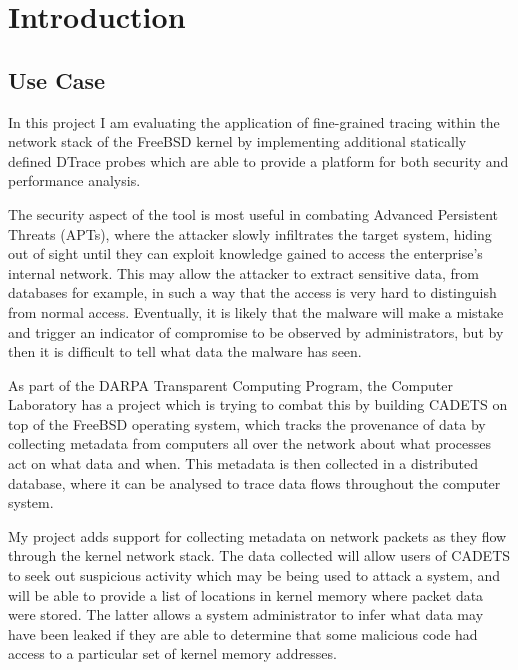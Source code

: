 \documentclass[a4paper,12pt,twoside,openright]{report}
\begin{document}
	\listoffigures
	
	
	\pagestyle{headings}
	
	\chapter{Introduction}
	
	\section{Use Case}
	
	In this project I am evaluating the application of fine-grained tracing within the network stack of the FreeBSD kernel by implementing additional statically defined DTrace probes which are able to provide a platform for both security and performance analysis.
	
	The security aspect of the tool is most useful in combating Advanced Persistent Threats (APTs)\cite{Tankard-APT}, where the attacker slowly infiltrates the target system, hiding out of sight until they can exploit knowledge gained to access the enterprise’s internal network. This may allow the attacker to extract sensitive data, from databases for example, in such a way that the access is very hard to distinguish from normal access. Eventually, it is likely that the malware will make a mistake and trigger an indicator of compromise to be observed by administrators, but by then it is difficult to tell what data the malware has seen.
	
	As part of the DARPA Transparent Computing Program\cite{DARPA-CT}, the Computer Laboratory has a project which is trying to combat this by building CADETS\cite{CADETS-main} on top of the FreeBSD operating system, which tracks the provenance of data by collecting metadata from computers all over the network about what processes act on what data and when. This metadata is then collected in a distributed database, where it can be analysed to trace data flows throughout the computer system.
	
	My project adds support for collecting metadata on network packets as they flow through the kernel	network stack. The data collected will allow users of CADETS to seek out suspicious activity which may be being used to attack a system, and will be able to provide a list of locations in kernel memory where packet data were stored. The latter allows a system administrator to infer what data may have been leaked if they are able to determine that some malicious code had access to a particular set of kernel memory addresses.
	
\end{document}
